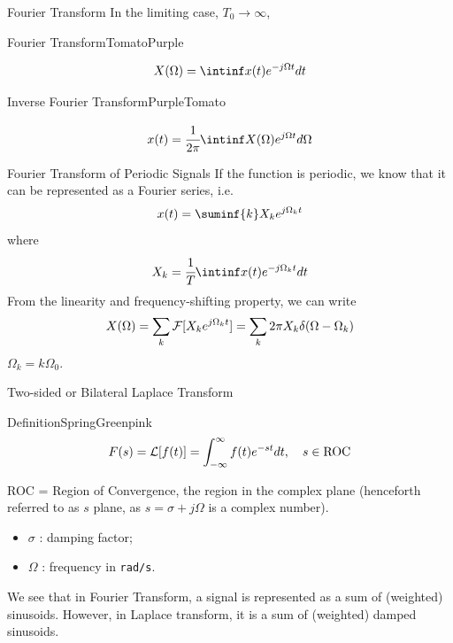 \documentclass[aspectratio=169,xcolor=dvipsnames,svgnames,x11names,fleqn]{beamer}
\begin{document}
\begin{frame}{Fourier Transform}
In the limiting case, $T_0 \to \infty$,

\begin{custombox}{Fourier Transform}{Tomato}{Purple}

$$
X(\Omega) = \intinf x(t) e^{-j \Omega t} dt
$$
\end{custombox}

    \begin{custombox}{Inverse Fourier Transform}{Purple}{Tomato}

$$
x(t) = \cfrac{1}{2\pi}\intinf X(\Omega) e^{j \Omega t} d\Omega
$$
\end{custombox}

    
\end{frame}

\begin{frame}{Fourier Transform of Periodic Signals}
If the function is periodic, we know that it can be represented as a Fourier series, i.e.
$$
x(t) = \suminf{k} X_k e^{j\Omega_k t}
$$
where 
$$
X_k = \cfrac{1}{T} \intinf x(t) e^{-j\Omega_k t} dt
$$
From the linearity and frequency-shifting property, we can write
$$
X(\Omega) = \sum_k {\mathcal F} [ X_k e^{j\Omega_k t}] = \sum_k 2\pi X_k \delta(\Omega - \Omega_k)
$$
$\Omega_k = k\Omega_0$.

\end{frame}


\begin{frame}{Two-sided or Bilateral Laplace Transform}
    
    \small
    
\begin{custombox}{Definition}{SpringGreen}{pink}
\Large
\begin{equation}
    F(s) = {\mathcal L}[ f(t) ] = \int_{-\infty}^\infty f(t) e^{-st} dt, \quad s\in \textrm{ROC}
\end{equation}
\end{custombox}

ROC = Region of Convergence, the region in the complex plane (henceforth referred to as $s$ plane, as $s= \sigma + j\Omega$ is a complex number).

\begin{itemize}
    \item $\sigma $ : damping factor;
    \item $\Omega $ : frequency in \texttt{rad/s}.
\end{itemize}

\begin{tblock}{}
We see that in Fourier Transform, a signal is represented as a sum of (weighted) sinusoids. However, in Laplace transform, it is a sum of (weighted) damped sinusoids.
\end{tblock}
    
\end{frame}
\end{document}
